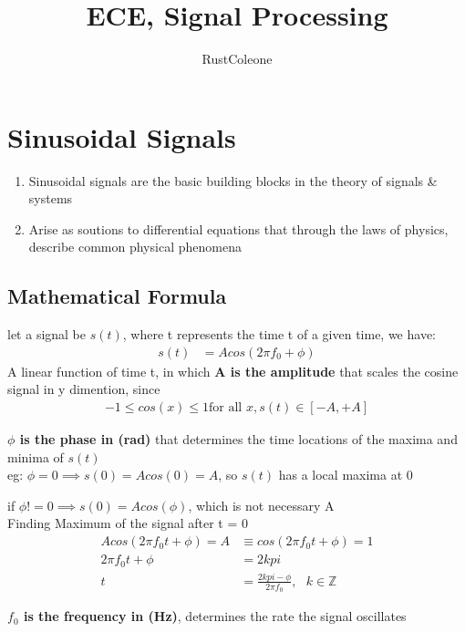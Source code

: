 \documentclass{article}
\author{RustColeone}
\title{ECE, Signal Processing}
\begin{document}
\maketitle
\section[]{Sinusoidal Signals}
    \begin{enumerate}
        \item Sinusoidal signals are the basic building blocks in the theory of signals \& systems
        \item Arise as soutions to differential equations that through the laws of physics, describe common physical phenomena
    \end{enumerate}
    \subsection[]{Mathematical Formula}
    let a signal be $s(t)$, where t represents the time t of a given time, we have:
    \begin{align}
        s(t) &= A cos(2 \pi f_0 + \phi)
    \end{align}
    A linear function of time t, in which \textbf{A is the amplitude} that scales the cosine signal in y dimention, since
    \begin{align}
        -1 \leq cos(x) \leq 1 \text{for all } x, s(t) \in [-A, +A]
    \end{align}

    \textbf{$\phi$ is the phase in (rad)} that determines the time locations of the maxima and minima of $s(t)$\\

    eg: $\phi = 0 \implies s(0) = Acos(0) = A$, so $s(t)$ has a local maxima at 0

    if $\phi != 0 \implies s(0) = Acos(\phi)$, which is not necessary A\\
    
    Finding Maximum of the signal after t = 0
    \begin{align}
        Acos(2 \pi f_0 t + \phi) = A &\equiv cos(2 \pi f_0 t + \phi) = 1 \\
        2 \pi f_0 t + \phi &= 2 k pi \\
        t &= \frac{2 k pi - \phi}{2 \pi f_0}, \text{ } k \in \mathbb{Z}
    \end{align}

    \textbf{$f_0$ is the frequency in (Hz)}, determines the rate the signal oscillates
    
\end{document}
